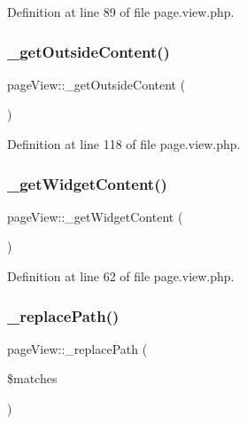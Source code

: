 Definition at line 89 of file page.\+view.\+php.

\hypertarget{classpageView_aa8045c86496ebdaa32c18e648be079f3}{}\label{classpageView_aa8045c86496ebdaa32c18e648be079f3} 
\subsubsection{\texorpdfstring{\+\_\+get\+Outside\+Content()}{\_getOutsideContent()}}
{\footnotesize\ttfamily page\+View\+::\+\_\+get\+Outside\+Content (\begin{DoxyParamCaption}{ }\end{DoxyParamCaption})}



Definition at line 118 of file page.\+view.\+php.

\hypertarget{classpageView_a5f10c6cf83c7e65e3359423211ead3d8}{}\label{classpageView_a5f10c6cf83c7e65e3359423211ead3d8} 
\subsubsection{\texorpdfstring{\+\_\+get\+Widget\+Content()}{\_getWidgetContent()}}
{\footnotesize\ttfamily page\+View\+::\+\_\+get\+Widget\+Content (\begin{DoxyParamCaption}{ }\end{DoxyParamCaption})}



Definition at line 62 of file page.\+view.\+php.

\hypertarget{classpageView_a271e9a47148d838689894366475cefd2}{}\label{classpageView_a271e9a47148d838689894366475cefd2} 
\subsubsection{\texorpdfstring{\+\_\+replace\+Path()}{\_replacePath()}}
{\footnotesize\ttfamily page\+View\+::\+\_\+replace\+Path (\begin{DoxyParamCaption}\item[{}]{\$matches }\end{DoxyParamCaption})}




